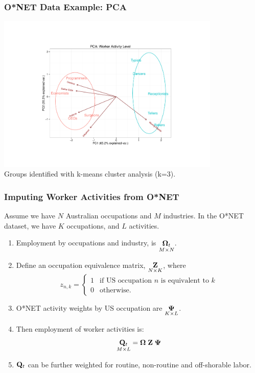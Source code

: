 \documentclass[red]{beamer}
\begin{document}
\begin{frame}
  \frametitle{O*NET Data Example: PCA}
  \begin{center}
  \includegraphics[width=0.8\textwidth]{slides/pca_example.pdf} \\
  Groups identified with k-means cluster analysis (k=3).
  \end{center}
\end{frame}


\begin{frame}
  \frametitle{Imputing Worker Activities from O*NET}
Assume we have $N$ Australian occupations and $M$ industries.
In the O*NET dataset, we have $K$ occupations, and $L$ activities.
  \begin{enumerate}
  \item Employment by occupations and industry, is 
    $\underset{M\times N}{{\bf \Omega}_t}$.
  \item Define an occupation equivalence matrix, $\underset{N\times K}{\bf Z}$, where \vspace{-10pt}   \[
    z_{n,k} = \left\{ 
      \begin{array}{ll}1 &\text{if US occupation $n$ is equivalent to $k$}\\
      0 & \text{otherwise.}\end{array}\right.
    \]
  \item O*NET activity weights by US occupation are $\underset{K\times L}{\bf \Psi}$.
  \item Then employment of worker activities is:
    $$ \underset{M\times L}{{\bf Q}_t} = {\bf \Omega\; Z\; \Psi} $$
  \item ${{\bf Q}_t}$ can be further weighted for routine, non-routine and off-shorable labor.
  \end{enumerate}
\end{frame}
\end{document}
